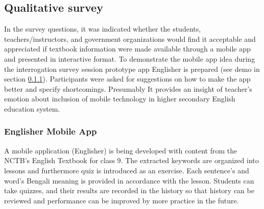 \documentclass[sn-mathphys,Numbered]{sn-jnl}%
\theoremstyle{thmstyleone}%
\theoremstyle{thmstyletwo}%
\theoremstyle{thmstylethree}%
\begin{document}
\subsection{Qualitative survey}\label{qual_survey}
In the survey questions, it was indicated whether the students, teachers/instructors, and government organizations would find it acceptable and appreciated if textbook information were made available through a mobile app and presented in interactive format. To demonstrate the mobile app idea during the interrogation survey session prototype app Englisher is prepared (see demo in section \ref{Englisher_mobile_app}). Participants were asked for suggestions on how to make the app better and specify shortcomings. Presumably It provides an insight of teacher’s emotion about inclusion of mobile technology in higher secondary English education system. 

\subsubsection{Englisher Mobile App}
\label{Englisher_mobile_app}
A mobile application (Englisher) is being developed with content from the NCTB’s English Textbook for class 9. The extracted keywords are organized into lessons and furthermore quiz is introduced as an exercise. Each sentence's and word's Bengali meaning is provided in accordance with the lesson. Students can take quizzes, and their results are recorded in the history so that history can be reviewed and performance can be improved by more practice in the future. 
\end{document}
